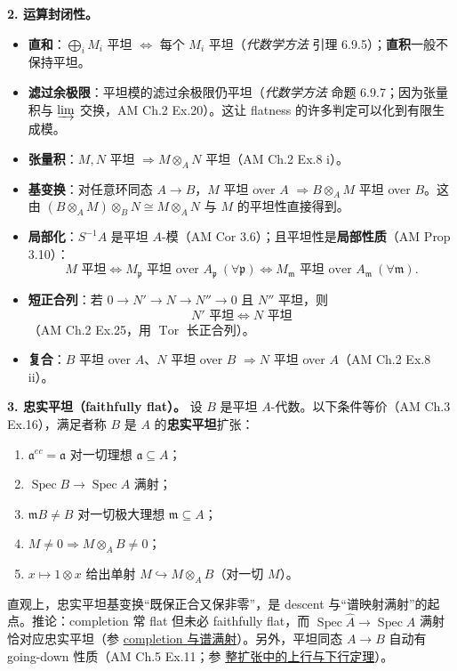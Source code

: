 \documentclass[a4paper]{ctexart}
\theoremstyle{definition}
\theoremstyle{analysis}
\theoremstyle{plain}
\begin{document}
\textbf{2. 运算封闭性。}
\begin{itemize}
  \item \textbf{直和}：\(\bigoplus_i M_i\) 平坦 \(\iff\) 每个 \(M_i\) 平坦（\textit{代数学方法} 引理 6.9.5）；\textbf{直积}一般不保持平坦。
  \item \textbf{滤过余极限}：平坦模的滤过余极限仍平坦（\textit{代数学方法} 命题 6.9.7；因为张量积与 \(\varinjlim\) 交换，AM Ch.2 Ex.20）。这让 flatness 的许多判定可以化到有限生成模。
  \item \textbf{张量积}：\(M,N\) 平坦 \(\Rightarrow M\otimes_A N\) 平坦（AM Ch.2 Ex.8 i）。
  \item \textbf{基变换}：对任意环同态 \(A\to B\)，\(M\) 平坦 over \(A\) \(\Rightarrow B\otimes_A M\) 平坦 over \(B\)。这由 \((B\otimes_A M)\otimes_B N\cong M\otimes_A N\) 与 \(M\) 的平坦性直接得到。
  \item \textbf{局部化}：\(S^{-1}A\) 是平坦 \(A\)-模（AM Cor 3.6）；且平坦性是\textbf{局部性质}（AM Prop 3.10）：
  \[
    M\text{ 平坦}
    \iff M_{\mathfrak p}\text{ 平坦 over }A_{\mathfrak p}\ (\forall\mathfrak p)
    \iff M_{\mathfrak m}\text{ 平坦 over }A_{\mathfrak m}\ (\forall\mathfrak m).
  \]
  \item \textbf{短正合列}：若 \(0\to N'\to N\to N''\to 0\) 且 \(N''\) 平坦，则
  \[
    N'\text{ 平坦}\iff N\text{ 平坦}
  \]
  （AM Ch.2 Ex.25，用 \(\operatorname{Tor}\) 长正合列）。
  \item \textbf{复合}：\(B\) 平坦 over \(A\)、\(N\) 平坦 over \(B\) \(\Rightarrow N\) 平坦 over \(A\)（AM Ch.2 Ex.8 ii）。
\end{itemize}

\medskip

\textbf{3. 忠实平坦（faithfully flat）。}
设 \(B\) 是平坦 \(A\)-代数。以下条件等价（AM Ch.3 Ex.16），满足者称 \(B\) 是 \(A\) 的\textbf{忠实平坦}扩张：
\begin{enumerate}
  \item \(\mathfrak a^{ec}=\mathfrak a\) 对一切理想 \(\mathfrak a\subseteq A\)；
  \item \(\operatorname{Spec}B\to\operatorname{Spec}A\) 满射；
  \item \(\mathfrak mB\ne B\) 对一切极大理想 \(\mathfrak m\subseteq A\)；
  \item \(M\ne0\Rightarrow M\otimes_A B\ne0\)；
  \item \(x\mapsto1\otimes x\) 给出单射 \(M\hookrightarrow M\otimes_A B\)（对一切 \(M\)）。
\end{enumerate}
直观上，忠实平坦基变换``既保正合又保非零''，是 descent 与``谱映射满射''的起点。推论：completion 常 flat 但未必 faithfully flat，而 \(\operatorname{Spec}\widehat A\to\operatorname{Spec}A\) 满射恰对应忠实平坦（参 \hyperref[rem:completion-spec-not-surjective]{completion 与谱满射}）。另外，平坦同态 \(A\to B\) 自动有 going-down 性质（AM Ch.5 Ex.11；参 \hyperref[subsec:going-up-down]{整扩张中的上行与下行定理}）。
\end{document}
